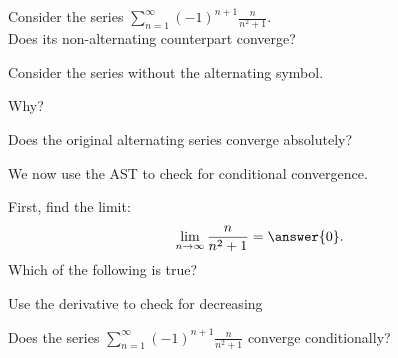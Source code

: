 \documentclass{ximera}
\begin{document}
\begin{problem}
Consider the series $\displaystyle{\sum_{n=1}^\infty (-1)^{n+1} \frac{n}{n^2 + 1}}$.\\
Does its non-alternating counterpart converge?
\begin{hint} 
Consider the series without the alternating symbol.
\end{hint}
\begin{multipleChoice}
\end{multipleChoice}

Why?
\begin{multipleChoice}
\end{multipleChoice}




Does the original alternating series converge absolutely?
\begin{multipleChoice}
\end{multipleChoice}

We now use the AST to check for conditional convergence.

First, find the limit:
\[
\lim_{n\to\infty} \frac{n}{n^2 + 1} = \answer{0}.
\]
Which of the following is true? 
\begin{hint}
Use the derivative to check for decreasing
\end{hint}
\begin{multipleChoice}
\end{multipleChoice}


Does the series $\displaystyle{\sum_{n=1}^\infty (-1)^{n+1} \frac{n}{n^2 + 1}}$ converge conditionally?
\begin{multipleChoice}
\end{multipleChoice}

\end{problem}
\end{document}
